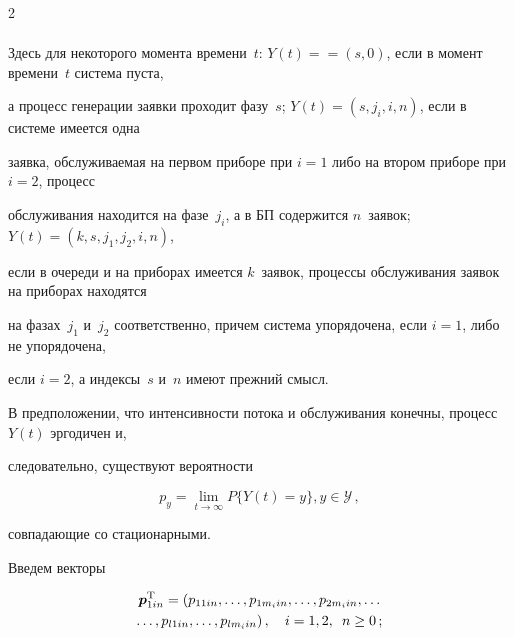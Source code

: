 \begin{multicols}{2}
\begin{align*}
\end{align*}

Здесь для некоторого момента времени~$t$: $Y(t)=$\linebreak $=(s,0)$, если в момент времени~$t$ система пус\-та, 

а процесс генерации заявки проходит фазу~$s$;  $Y(t)=(s,j_i,i,n)$, если в системе имеется одна 

заявка, обслуживаемая на первом приборе при $i=1$ либо на втором приборе при $i=2$, процесс 

обслуживания находится на фазе~$j_i$, а в БП содержится $n$~заявок; $Y(t)=(k,s,j_1,j_2,i,n)$, 

если в очереди и на приборах имеется $k$~заявок, процессы обслуживания заявок на приборах находятся 

на фазах~$j_1$ и~$j_2$ соответственно, причем система упорядочена, если $i=1$, либо не упорядочена, 

если $i=2$, а индексы~$s$ и~$n$ имеют прежний смысл.



В предположении, что интенсивности потока и обслуживания конечны, процесс~$Y(t)$ эргодичен и, 

следовательно, существуют вероятности

\begin{equation*}

p_y=\lim\limits_{t\rightarrow\infty}P\{Y(t)=y\}, y\in \mathcal{Y}\,,

\end{equation*}

совпадающие со стационарными.



Введем векторы

\begin{multline*}

\boldsymbol{p}_{1in}^{\mathrm{T}}=

(p_{11in},\ldots,p_{1m_iin},\ldots , p_{2m_iin},\ldots\\

\ldots , p_{l1in},\ldots, p_{lm_iin})\,,\quad  i=1,2,\enskip n\geq 0\,;

\end{multline*}



\vspace*{-14pt}



\noindent

\begin{multline*}


\end{multline*}
\end{multicols}
